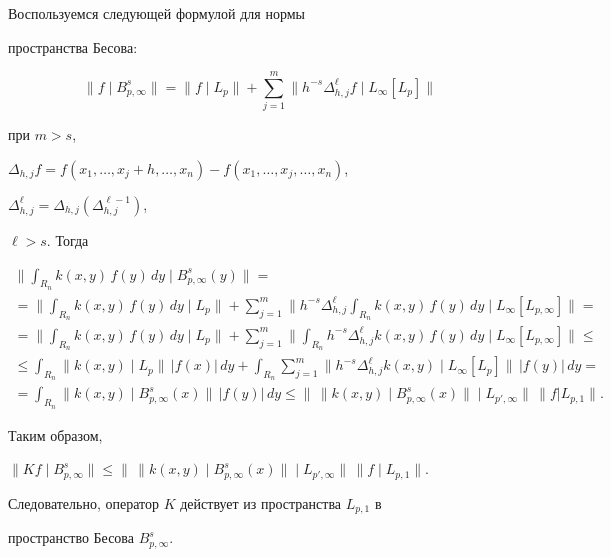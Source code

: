 \begin{pf}


Воспользуемся следующей формулой для нормы


пространства Бесова:


$$


\| f\mid B^s_{p,\infty }\| =\| f\mid L_p\| +\sum_{j=1}^m \| h^{-s}


\Delta^{\ell }_{h,j}f \mid L_{\infty }[L_p] \|


$$


при $m>s$,


$\Delta_{h,j}f=f(x_1,\dotsc,x_j+h,\dotsc,x_n)-


f(x_1,\dotsc,x_j,\dotsc,x_n)$,


$\Delta^{\ell}_{h,j}= \Delta_{h,j} (\Delta^{\ell -1}_{h,j})$,


$\ell >s$. Тогда


\begin{multline*}


\bigg\| \int_{R_n} k(x,y)\,f(y)\,dy \mid B^s_{p,\infty } (y)\bigg\| = \\


%


= \bigg\| \int_{R_n} k(x,y)\,f(y)\,dy \mid L_p \bigg\| + \sum^m_{j=1}


\bigg\|h^{-s}\Delta^{\ell }_{h,j} \int_{R_n}


k(x,y)\,f(y)\,dy\mid L_{\infty} [L_{p,\infty }]\bigg\| = \\


%


= \bigg\| \int_{R_n} k(x,y)\,f(y)\,dy \mid L_p \bigg\| + \sum^m_{j=1}


\bigg\|\int_{R_n}h^{-s}\Delta^{\ell }_{h,j} k(x,y)\,f(y)\,dy


\mid L_{\infty }[L_{p,\infty }]\bigg\| \le \\


%


\le \int_{R_n} \| k(x,y)\mid L_p\|\, |f(x)|\,dy + \int_{R_n}


\sum^m_{j=1}\| h^{-s}\Delta^{\ell }_{h,j} k(x,y)\mid


L_{\infty}[L_p]\|\,|f(y)|\,dy = \\


%


= \int_{R_n} \|k(x,y)\mid B^s_{p,\infty }(x)\| \,|f(y)|\, dy \le


\big\| \,\|k(x,y)\mid B^s_{p,\infty }(x)\|\mid


L_{p',\infty}\big\|\, \|f|L_{p,1}\|.


\end{multline*}


Таким образом,


$\|Kf\mid B^s_{p,\infty }\| \le \big\|\,\|k(x,y)\mid B^s_{p,\infty}


(x)\|\mid L_{p',\infty}\big\| \, \|f\mid L_{p,1}\|$.


Следовательно, оператор $K$ действует из пространства $L_{p,1}$ в


пространство Бесова $B^s_{p,\infty }$.


\end{pf}





